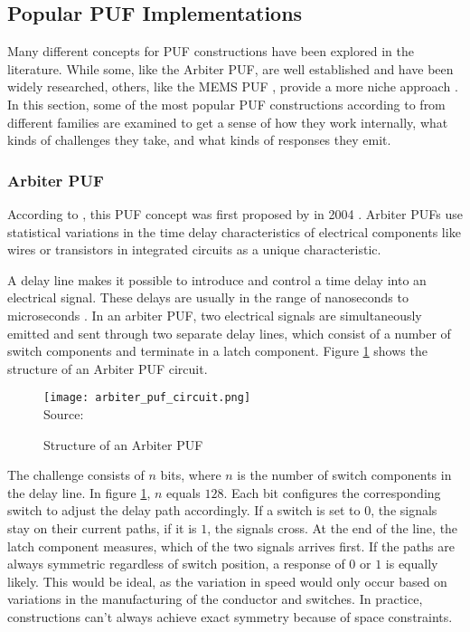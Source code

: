 \subsection{Popular PUF Implementations}
\label{sec:puf_implementations}
Many different concepts for PUF constructions have been explored in the literature.
While some, like the Arbiter PUF, are well established and have been widely researched,
others, like the MEMS PUF \cite{Aysu2013}, provide a more niche approach \cite[][p. 2]{McGrath2019}.
In this section, some of the most popular PUF constructions according to \cite{McGrath2019}
from different families are examined to get a sense of how they work internally,
what kinds of challenges they take, and what kinds of responses they emit.

\subsubsection{Arbiter PUF}

According to \cite[][p. 6]{McGrath2019}, this PUF concept was first proposed by \citeauthor*{Lee} in 2004 \cite{Lee}.
Arbiter PUFs use statistical variations in the time delay characteristics of electrical components like wires or transistors
in integrated circuits as a unique characteristic. \cite[][p. 176]{Lee}

A delay line makes it possible to introduce and control a time delay into an electrical signal.
These delays are usually in the range of nanoseconds to microseconds \cite[][p. 1]{Shahoei2014}.
In an arbiter PUF, two electrical signals are simultaneously emitted and
sent through two separate delay lines, which consist of a number of switch components
and terminate in a latch component.
Figure \ref{fig:arbiter_puf_circuit} shows the structure of an Arbiter PUF circuit.

\begin{figure}[H]
    \centering
    \caption{Structure of an Arbiter PUF}
    \label{fig:arbiter_puf_circuit}
    \texttt{[image: arbiter\_puf\_circuit.png]}
    \\
    Source: \cite[][p. 1130]{Herder2014}
\end{figure}

The challenge consists of $n$ bits, where $n$ is the number of switch components
in the delay line. In figure \ref{fig:arbiter_puf_circuit}, $n$ equals $128$.
Each bit configures the corresponding switch to adjust the delay path accordingly.
If a switch is set to $0$, the signals stay on their current paths,
if it is $1$, the signals cross.
At the end of the line, the latch component measures, which of the two signals arrives first.
If the paths are always symmetric regardless of switch position, a response of $0$ or $1$ is
equally likely. This would be ideal, as the variation in speed would only occur based on
variations in the manufacturing of the conductor and switches.
In practice, constructions can't always achieve exact symmetry because of space constraints. \cite[][p. 177]{Lee}

